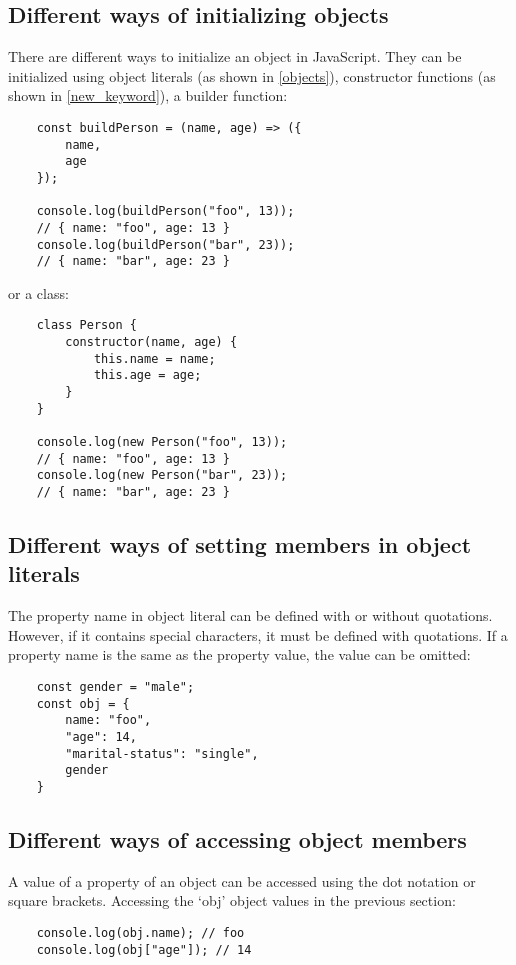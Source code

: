 \documentclass[11pt,a4paper]{article}
\begin{document}
\subsection{Different ways of initializing objects}
There are different ways to initialize an object in JavaScript.
They can be initialized using object literals (as shown in \ref{objects}),
constructor functions (as shown in \ref{new_keyword}),
a builder function:
\begin{verbatim}
    const buildPerson = (name, age) => ({
        name,
        age
    });

    console.log(buildPerson("foo", 13));
    // { name: "foo", age: 13 }
    console.log(buildPerson("bar", 23));
    // { name: "bar", age: 23 }
\end{verbatim}
or a class:
\begin{verbatim}
    class Person {
        constructor(name, age) {
            this.name = name;
            this.age = age;
        }
    }

    console.log(new Person("foo", 13));
    // { name: "foo", age: 13 }
    console.log(new Person("bar", 23));
    // { name: "bar", age: 23 }
\end{verbatim}

\subsection{Different ways of setting members in object literals}
The property name in object literal can be defined with or without quotations.
However, if it contains special characters, it must be defined with quotations.
If a property name is the same as the property value, the value can be omitted:
\begin{verbatim}
    const gender = "male";
    const obj = {
        name: "foo",
        "age": 14,
        "marital-status": "single",
        gender
    }
\end{verbatim}

\subsection{Different ways of accessing object members}
A value of a property of an object can be accessed using the dot notation or square brackets.
Accessing the `obj' object values in the previous section:
\begin{verbatim}
    console.log(obj.name); // foo
    console.log(obj["age"]); // 14
\end{verbatim}
\end{document}
